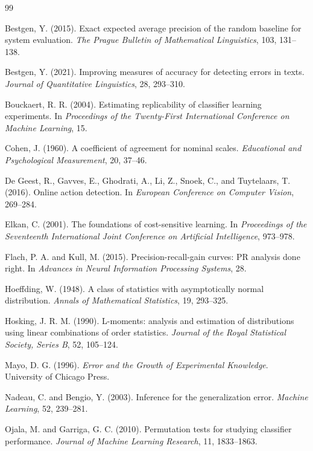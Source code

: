 \documentclass[11pt]{article}
\theoremstyle{remark}
\begin{document}
\begin{thebibliography}{99}

Bestgen, Y. (2015).
Exact expected average precision of the random baseline for system evaluation.
\emph{The Prague Bulletin of Mathematical Linguistics}, 103, 131--138.

Bestgen, Y. (2021).
Improving measures of accuracy for detecting errors in texts.
\emph{Journal of Quantitative Linguistics}, 28, 293--310.

Bouckaert, R. R. (2004).
Estimating replicability of classifier learning experiments.
In \emph{Proceedings of the Twenty-First International Conference on Machine Learning}, 15.

Cohen, J. (1960).
A coefficient of agreement for nominal scales.
\emph{Educational and Psychological Measurement}, 20, 37--46.

De Geest, R., Gavves, E., Ghodrati, A., Li, Z., Snoek, C., and Tuytelaars, T. (2016).
Online action detection.
In \emph{European Conference on Computer Vision}, 269--284.

Elkan, C. (2001).
The foundations of cost-sensitive learning.
In \emph{Proceedings of the Seventeenth International Joint Conference on Artificial Intelligence}, 973--978.

Flach, P. A. and Kull, M. (2015).
Precision-recall-gain curves: PR analysis done right.
In \emph{Advances in Neural Information Processing Systems}, 28.

Hoeffding, W. (1948).
A class of statistics with asymptotically normal distribution.
\emph{Annals of Mathematical Statistics}, 19, 293--325.

Hosking, J. R. M. (1990).
L-moments: analysis and estimation of distributions using linear combinations of order statistics.
\emph{Journal of the Royal Statistical Society, Series B}, 52, 105--124.

Mayo, D. G. (1996).
\emph{Error and the Growth of Experimental Knowledge}.
University of Chicago Press.

Nadeau, C. and Bengio, Y. (2003).
Inference for the generalization error.
\emph{Machine Learning}, 52, 239--281.

Ojala, M. and Garriga, G. C. (2010).
Permutation tests for studying classifier performance.
\emph{Journal of Machine Learning Research}, 11, 1833--1863.


\end{thebibliography}
\end{document}
